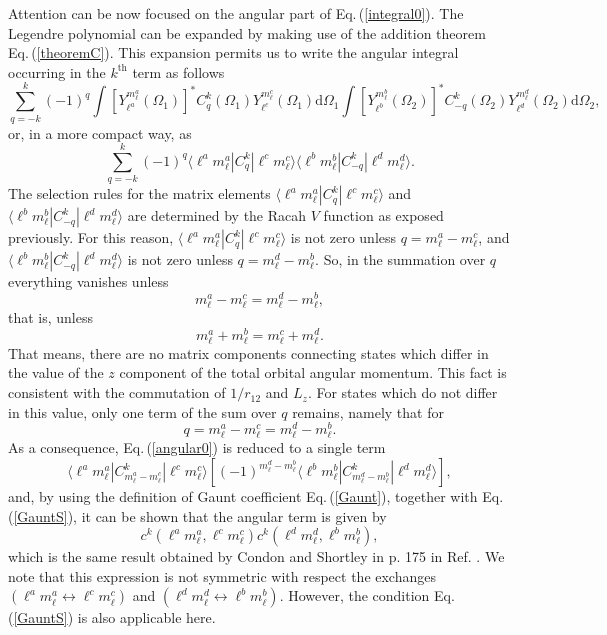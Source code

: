 \documentclass[]{interact}
\def\refe#1{{\color{blue}\textsf{Eq.}\,(\ref{#1})}}
\def\d{\mathrm{d}}
\renewcommand{\l}{\ell}
\begin{document}
Attention can be now focused on the angular part of \refe{integral0}. The Legendre polynomial can be expanded by making use of the addition theorem \refe{theoremC}. This expansion permits us to write the angular integral occurring in the $k^\mathrm{th}$ term as follows
\begin{equation}
 \sum_{q=-k}^{k}(-1)^q\int \left[Y_{\l^a}^{m_\l^a}(\Omega_1)\right]^*C^{k}_q(\Omega_1)Y_{\l^c}^{m_\l^c}(\Omega_1)\d\Omega_1\int \left[Y_{\l^b}^{m_\l^b}(\Omega_2)\right]^*C^{k}_{-q}(\Omega_2)Y_{\l^d}^{m_\l^d}(\Omega_2)\d\Omega_2,
\end{equation}
or, in a more compact way, as 
\begin{equation}
\label{angular0}
 \sum_{q=-k}^{k}(-1)^q\langle {\l^a}{m_\l^a}|C^{k}_q|{\l^c}{m_\l^c}\rangle \langle {\l^b}{m_\l^b}|C^{k}_{-q}|{\l^d}{m_\l^d}\rangle.
\end{equation}
The selection rules for the matrix elements $\langle {\l^a}{m_\l^a}|C^{k}_q|{\l^c}{m_\l^c}\rangle$ and $\langle {\l^b}{m_\l^b}|C^{k}_{-q}|{\l^d}{m_\l^d}\rangle$ are determined by the Racah $V$ function as exposed previously. For this reason, $\langle {\l^a}{m_\l^a}|C^{k}_q|{\l^c}{m_\l^c}\rangle$ is not zero unless $q=m_\l^a-m_\l^c$, and $\langle {\l^b}{m_\l^b}|C^{k}_{-q}|{\l^d}{m_\l^d}\rangle$ is not zero unless $q=m_\l^d-m_\l^b$. So, in the summation over $q$ everything vanishes unless
$$m_\l^a-m_\l^c=m_\l^d-m_\l^b,$$
that is, unless
\begin{equation}
\label{q_condition}
 m_\l^a+m_\l^b=m_\l^c+m_\l^d.
\end{equation}
That means, there are no matrix components connecting states which differ in the value of the $z$ component of the total orbital angular momentum. This fact is consistent with the commutation of $1/r_{12}$ and $L_z$. For states which do not differ in this value, only one term of the sum over $q$ remains, namely that for 
$$q=m_\l^a-m_\l^c=m_\l^d-m_\l^b.$$
As a consequence, \refe{angular0} is reduced to a single term
\begin{equation}
 \langle {\l^a}{m_\l^a}|C^{k}_{m_\l^a-m_\l^c}|{\l^c}{m_\l^c}\rangle\left[(-1)^{m_\l^d-m_\l^b}\langle {\l^b}{m_\l^b}|C^{k}_{m_\l^d-m_\l^b}|{\l^d}{m_\l^d}\rangle\right],
\end{equation}
and, by using the definition of Gaunt coefficient \refe{Gaunt}, together with \refe{GauntS}, it can be shown that the angular term is given by
\begin{equation}
 c^k({\l^a}{m_\l^a},{\l^c}{m_\l^c})c^k({\l^d}{m_\l^d},{\l^b}{m_\l^b}),
\end{equation}
which is the same result obtained by Condon and Shortley in p. 175 in Ref. \cite{Condon}. We note that this expression is not symmetric with respect the exchanges $({\l^a}{m_\l^a}\leftrightarrow{\l^c}{m_\l^c})$ and $({\l^d}{m_\l^d}\leftrightarrow{\l^b}{m_\l^b})$. However, the condition \refe{GauntS} is also applicable here.
\end{document}
